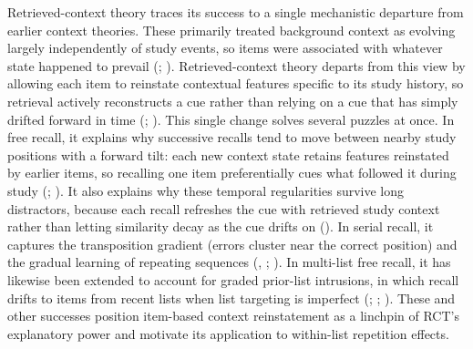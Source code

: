 \documentclass[
  man,
  floatsintext,
  longtable,
  nolmodern,
  notxfonts,
  notimes,
  draftfirst,
  colorlinks=true,linkcolor=blue,citecolor=blue,urlcolor=blue]{apa7}
\begin{document}
Retrieved-context theory traces its success to a single mechanistic
departure from earlier context theories. These primarily treated
background context as evolving largely independently of study events, so
items were associated with whatever state happened to prevail
(;
).
Retrieved-context theory departs from this view by allowing each item to
reinstate contextual features specific to its study history, so
retrieval actively reconstructs a cue rather than relying on a cue that
has simply drifted forward in time
(;
). This single
change solves several puzzles at once. In free recall, it explains why
successive recalls tend to move between nearby study positions with a
forward tilt: each new context state retains features reinstated by
earlier items, so recalling one item preferentially cues what followed
it during study (; ). It also
explains why these temporal regularities survive long distractors,
because each recall refreshes the cue with retrieved study context
rather than letting similarity decay as the cue drifts on
(). In serial
recall, it captures the transposition gradient (errors cluster near the
correct position) and the gradual learning of repeating sequences
(,
;
). In multi-list free
recall, it has likewise been extended to account for graded prior-list
intrusions, in which recall drifts to items from recent lists when list
targeting is imperfect (; ;
). These and other
successes position item-based context reinstatement as a linchpin of
RCT's explanatory power and motivate its application to within-list
repetition effects.
\end{document}
